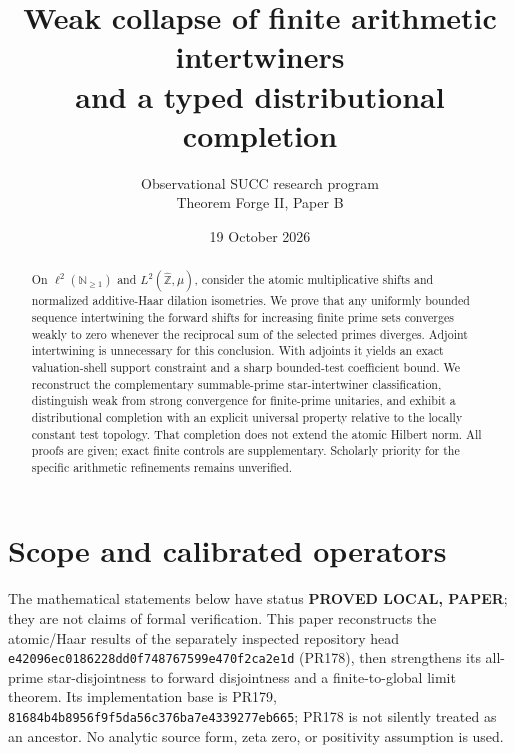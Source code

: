 \documentclass[11pt]{article}
\title{Weak collapse of finite arithmetic intertwiners\\
and a typed distributional completion}
\author{Observational SUCC research program\\Theorem Forge II, Paper B}
\date{19 October 2026}
\theoremstyle{remark}
\newcommand{\N}{\mathbb N}
\newcommand{\Zhat}{\widehat{\mathbb Z}}
\begin{document}
\maketitle
\begin{abstract}
On $\ell^2(\N_{\geq1})$ and $L^2(\Zhat,\mu)$, consider the atomic
multiplicative shifts and normalized additive-Haar dilation isometries.
We prove that any uniformly bounded sequence intertwining the forward
shifts for increasing finite prime sets converges weakly to zero whenever
the reciprocal sum of the selected primes diverges.  Adjoint intertwining
is unnecessary for this conclusion.  With adjoints it yields an exact
valuation-shell support constraint and a sharp bounded-test coefficient
bound.  We reconstruct the complementary summable-prime star-intertwiner
classification, distinguish weak from strong convergence for finite-prime
unitaries, and exhibit a distributional completion with an explicit
universal property relative to the locally constant test topology.
That completion does not extend the atomic Hilbert norm.  All proofs are
given; exact finite controls are supplementary.  Scholarly priority for
the specific arithmetic refinements remains unverified.
\end{abstract}

\section{Scope and calibrated operators}

The mathematical statements below have status \textbf{PROVED LOCAL, PAPER};
they are not claims of formal verification.  This paper reconstructs the
atomic/Haar results of the separately inspected repository head
\texttt{e42096ec0186228dd0f748767599e470f2ca2e1d} (PR178), then strengthens its
all-prime star-disjointness to forward disjointness and a finite-to-global
limit theorem.  Its implementation base is PR179,
\texttt{81684b4b8956f9f5da56c376ba7e4339277eb665}; PR178 is not silently treated
as an ancestor.  No analytic source form, zeta zero, or positivity assumption
is used.
\end{document}
